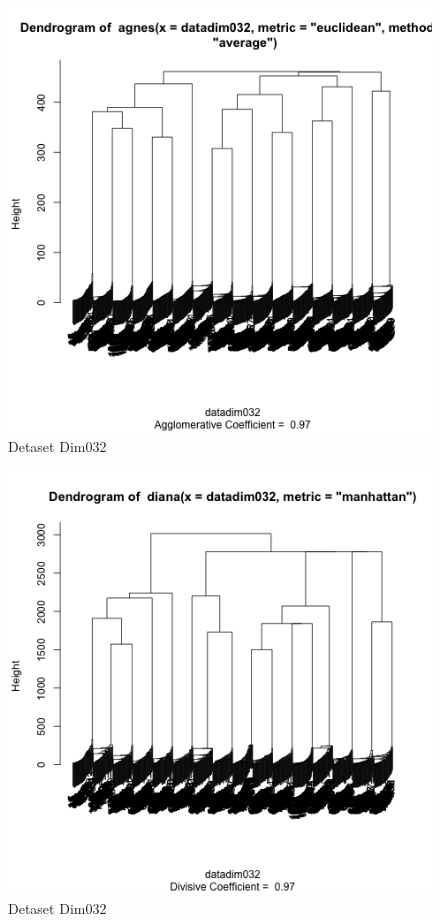 \documentclass{article}
\begin{document}
\begin{figure}[ht!]
\caption{Detaset Dim032}
\centering
\includegraphics[width=1\textwidth]{plots/ang3dim032.png}
\end{figure}

\begin{figure}[ht!]
\caption{Detaset Dim032}
\centering
\includegraphics[width=1\textwidth]{plots/dv1dim032.png}
\end{figure}
\end{document}
